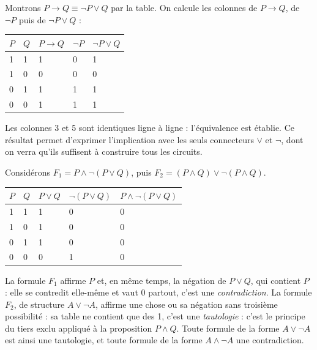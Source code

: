 \begin{exemple}
Montrons $P \rightarrow Q \equiv \lnot P \lor Q$ par la table. On calcule les colonnes de $P \rightarrow Q$, de $\lnot P$ puis de $\lnot P \lor Q$ :

\begin{center}
\begin{tabular}{C{0.8cm}C{0.8cm}C{1.8cm}C{1.2cm}C{1.8cm}}
\toprule
{}$P$ & $Q$ & $P \rightarrow Q$ & $\lnot P$ & $\lnot P \lor Q$\\
 & 1 & 1 & 0 & 1\\
1 & 0 & 0 & 0 & 0\\
0 & 1 & 1 & 1 & 1\\
0 & 0 & 1 & 1 & 1\\
\bottomrule
\end{tabular}
\label{ch2:tab:impou}
\end{center}

Les colonnes 3 et 5 sont identiques ligne à ligne : l'équivalence est établie. Ce résultat permet d'exprimer l'implication avec les seuls connecteurs $\lor$ et $\lnot$, dont on verra qu'ils suffisent à construire tous les circuits.
\end{exemple}

\begin{exemple}
Considérons $F_1 = P \land \lnot(P \lor Q)$, puis $F_2 = (P \land Q) \lor \lnot(P \land Q)$.

\begin{center}
\begin{tabular}{C{0.8cm}C{0.8cm}C{1.5cm}C{2.0cm}C{2.9cm}}
\toprule
{}$P$ & $Q$ & $P \lor Q$ & $\lnot(P \lor Q)$ & $P \land \lnot(P \lor Q)$\\
 & 1 & 1 & 0 & 0\\
1 & 0 & 1 & 0 & 0\\
0 & 1 & 1 & 0 & 0\\
0 & 0 & 0 & 1 & 0\\
\bottomrule
\end{tabular}
\label{ch2:tab:contra}
\end{center}

La formule $F_1$ affirme $P$ et, en même temps, la négation de $P \lor Q$, qui contient $P$ : elle se contredit elle-même et vaut 0 partout, c'est une \emph{contradiction}. La formule $F_2$, de structure $A \lor \lnot A$, affirme une chose ou sa négation sans troisième possibilité : sa table ne contient que des 1, c'est une \emph{tautologie} : c'est le principe du tiers exclu appliqué à la proposition $P \land Q$. Toute formule de la forme $A \lor \lnot A$ est ainsi une tautologie, et toute formule de la forme $A \land \lnot A$ une contradiction.
\end{exemple}

